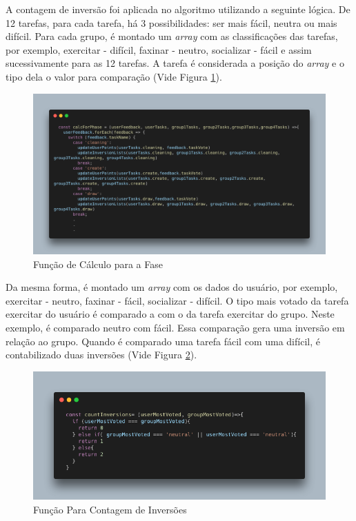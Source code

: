 A contagem de inversão foi aplicada no algoritmo utilizando a seguinte lógica. 
De 12 tarefas, para cada tarefa, 
há 3 possibilidades: ser mais fácil, neutra ou mais difícil. Para cada grupo, é montado um \emph{array} 
com as classificações das tarefas, por exemplo, exercitar - difícil, faxinar - neutro, socializar - fácil e assim 
sucessivamente para as 12 tarefas. A tarefa é considerada a posição do \emph{array} 
e o tipo dela o valor para comparação (Vide Figura \ref{fig16}).

\begin{figure}[ht]
	\caption{Função de Cálculo para a Fase}
	\begin{center}
	\includegraphics[keepaspectratio=true,scale=0.3]{figuras/code-calForPhase.png}
	\end{center}
    \label{fig16}
\end{figure}

Da mesma forma, é montado um \emph{array} com os dados 
do usuário, por exemplo, exercitar - neutro, 
faxinar - fácil, socializar - difícil. O tipo mais votado da tarefa exercitar do usuário é comparado a com o da tarefa 
exercitar do grupo. 
Neste exemplo, é comparado neutro com fácil. Essa comparação gera uma inversão em relação ao grupo. 
Quando é comparado uma tarefa fácil com uma difícil, é contabilizado duas inversões (Vide Figura \ref{fig18}). 

\begin{figure}[ht]
	\caption{Função Para Contagem de Inversões}
	\begin{center}
	\includegraphics[keepaspectratio=true,scale=0.4]{figuras/code-countInversions.png}
	\end{center}
    \label{fig18}
\end{figure}


